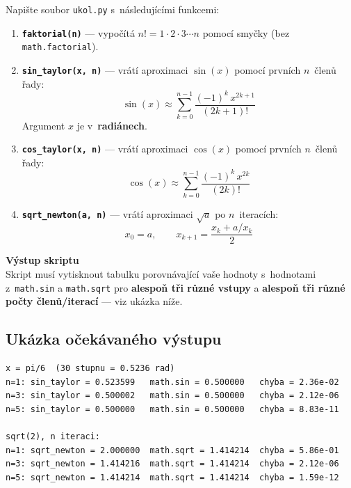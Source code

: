 \documentclass[12pt, a4paper]{article}
\begin{document}
\begin{zadanibox}
Napište soubor \texttt{ukol.py} s~následujícími funkcemi:

\begin{enumerate}

    \item \textbf{\texttt{faktorial(n)}} ---
          vypočítá $n! = 1 \cdot 2 \cdot 3 \cdots n$
          pomocí smyčky (bez \texttt{math.factorial}).

    \item \textbf{\texttt{sin\_taylor(x, n)}} ---
          vrátí aproximaci $\sin(x)$ pomocí prvních $n$~členů řady:
          \[
              \sin(x) \approx
              \sum_{k=0}^{n-1} \frac{(-1)^k\, x^{2k+1}}{(2k+1)!}
          \]
          Argument $x$ je v~\textbf{radiánech}.

    \item \textbf{\texttt{cos\_taylor(x, n)}} ---
          vrátí aproximaci $\cos(x)$ pomocí prvních $n$~členů řady:
          \[
              \cos(x) \approx
              \sum_{k=0}^{n-1} \frac{(-1)^k\, x^{2k}}{(2k)!}
          \]

    \item \textbf{\texttt{sqrt\_newton(a, n)}} ---
          vrátí aproximaci $\sqrt{a}$ po $n$~iteracích:
          \[
              x_0 = a, \qquad
              x_{k+1} = \frac{x_k + a/x_k}{2}
          \]

\end{enumerate}

\medskip

\textbf{Výstup skriptu}\\
Skript musí vytisknout tabulku porovnávající vaše hodnoty
s~hodnotami z~\texttt{math.sin} a \texttt{math.sqrt}
pro \textbf{alespoň tři různé vstupy} a \textbf{alespoň tři
různé počty členů/iterací} --- viz ukázka níže.

\end{zadanibox}

\bigskip

\subsection*{Ukázka očekávaného výstupu}

\begin{lstlisting}
x = pi/6  (30 stupnu = 0.5236 rad)
n=1: sin_taylor = 0.523599   math.sin = 0.500000   chyba = 2.36e-02
n=3: sin_taylor = 0.500002   math.sin = 0.500000   chyba = 2.12e-06
n=5: sin_taylor = 0.500000   math.sin = 0.500000   chyba = 8.83e-11

sqrt(2), n iteraci:
n=1: sqrt_newton = 2.000000  math.sqrt = 1.414214  chyba = 5.86e-01
n=3: sqrt_newton = 1.414216  math.sqrt = 1.414214  chyba = 2.12e-06
n=5: sqrt_newton = 1.414214  math.sqrt = 1.414214  chyba = 1.59e-12
\end{lstlisting}
\end{document}
